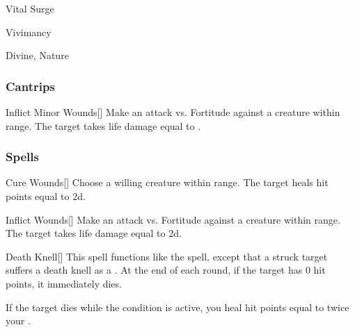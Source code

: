 \newpage
\begin{spellsection}{Vital Surge}

\begin{spellheader}
\end{spellheader}


 Vivimancy

 Divine, Nature

\subsubsection{Cantrips}


\begin{freeability}{Inflict Minor Wounds}[]
Make an attack vs. Fortitude against a creature within \rngmed range.
\hit The target takes life damage equal to .
\end{freeability}

\end{spellsection}


\subsubsection{Spells}


\lowercase{\hypertarget{spell:Cure Wounds}{}}\label{spell:Cure Wounds}
\begin{apability}[\nth{1}]{\hypertarget{spell:Cure Wounds}{Cure Wounds}}[]
Choose a willing creature within \rngmed range.
The target heals hit points equal to  \plus2d.
\end{apability}
\vspace{0.25em}



\lowercase{\hypertarget{spell:Inflict Wounds}{}}\label{spell:Inflict Wounds}
\begin{apability}[\nth{1}]{\hypertarget{spell:Inflict Wounds}{Inflict Wounds}}[]
Make an attack vs. Fortitude against a creature within \rngmed range.
\hit The target takes life damage equal to  \plus2d.
\end{apability}
\vspace{0.25em}



\lowercase{\hypertarget{spell:Death Knell}{}}\label{spell:Death Knell}
\begin{apability}[\nth{2}]{\hypertarget{spell:Death Knell}{Death Knell}}[]
This spell functions like the  spell, except that a struck target suffers a death knell as a .
At the end of each round, if the target has 0 hit points, it immediately dies.

If the target dies while the condition is active, you heal hit points equal to twice your .
\end{apability}
\vspace{0.25em}



